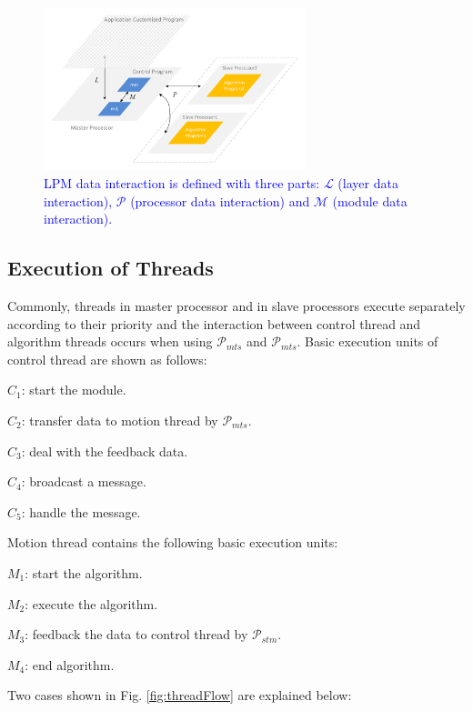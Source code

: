 \documentclass[journal,UTF8]{IEEEtran}
\begin{document}
 \begin{figure}
	\centering
	\includegraphics[width=3in]{fig/Interaction.pdf}
	\caption{ \textcolor{blue}{LPM data interaction is defined with three parts: $\mathcal{L}$ (layer data interaction), $\mathcal{P}$ (processor data interaction) and $\mathcal{M}$ (module data interaction).}}
	\label{fig:Interaction}
\end{figure}

 \subsection{Execution of Threads}
 Commonly, threads in master processor and in slave processors execute separately according to their priority and the interaction between control thread and algorithm threads occurs when using $\mathcal{P}_{mts}$ and $\mathcal{P}_{mts}$. Basic execution units of control thread are shown as follows:
 
 \textbf{$C_{1}$}: start the module.
 
 \textbf{$C_{2}$}: transfer data to motion thread by $\mathcal{P}_{mts}$.
 
 \textbf{$C_{3}$}: deal with the feedback data.
 
 \textbf{$C_{4}$}: broadcast a message.
 
  \textbf{$C_{5}$}: handle the message.
  
 Motion thread contains the following basic execution units:
 
 \textbf{$M_{1}$}: start the algorithm.
 
 \textbf{$M_{2}$}: execute the algorithm.
 
 \textbf{$M_{3}$}: feedback the data to control thread by $\mathcal{P}_{stm}$.
 
 \textbf{$M_{4}$}: end algorithm.
  
  Two cases shown in Fig. \ref{fig:threadFlow} are explained below:
  
\end{document}
